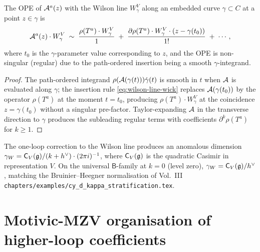 \begin{proposition}
\label{prop:ch-ce-wilson-line-ope}
%
The OPE of $\mathcal{A}^a(z)$ with the Wilson line $W^V_\gamma$ along an
embedded curve $\gamma\subset C$ at a point $z\in\gamma$ is
\begin{equation}
\label{eq:wilson-line-ope-gauge}
\mathcal{A}^a(z)\cdot W^V_\gamma
\;\sim\;
\frac{\rho(T^a)\cdot W^V_\gamma}{1}
\;+\;
\frac{\partial\rho(T^a)\cdot W^V_\gamma\cdot (z-\gamma(t_0))}{1!}
\;+\;
\cdots,
\end{equation}
where $t_0$ is the $\gamma$-parameter value corresponding to $z$, and
the OPE is non-singular (regular) due to the path-ordered insertion
being a smooth $\gamma$-integrand.
\end{proposition}

\begin{proof}
The path-ordered integrand $\rho(\mathcal{A}(\gamma(t)))\dot\gamma(t)$ is
smooth in $t$ when $\mathcal{A}$ is evaluated along $\gamma$; the insertion
rule \eqref{eq:wilson-line-wick} replaces $\mathcal{A}(\gamma(t_0))$ by the
operator $\rho(T^a)$ at the moment $t = t_0$, producing
$\rho(T^a)\cdot W^V_\gamma$ at the coincidence $z = \gamma(t_0)$
without a singular pre-factor. Taylor-expanding $\mathcal{A}$ in the
transverse direction to $\gamma$ produces the subleading regular
terms with coefficients $\partial^k\rho(T^a)$ for $k\ge 1$.
\end{proof}

\begin{remark}
\label{rem:ch-ce-wilson-line-anomalous}
%
The one-loop correction to the Wilson line produces an anomalous
dimension $\gamma_W = \mathsf C_V(\mathfrak{g})/(k+h^\vee)\cdot(2\pi i)^{-1}$,
where $\mathsf C_V(\mathfrak{g})$ is the quadratic Casimir in representation
$V$. On the universal $\mathsf{B}$-family at $k = 0$ (level zero),
$\gamma_W = \mathsf C_V(\mathfrak{g})/h^\vee$, matching the Bruinier--Heegner
normalisation of Vol.~III
\texttt{chapters/examples/cy\_d\_kappa\_stratification.tex}.
\end{remark}

\section{Motivic-MZV organisation of higher-loop coefficients}
\label{sec:ch-ce-motivic-mzv}

